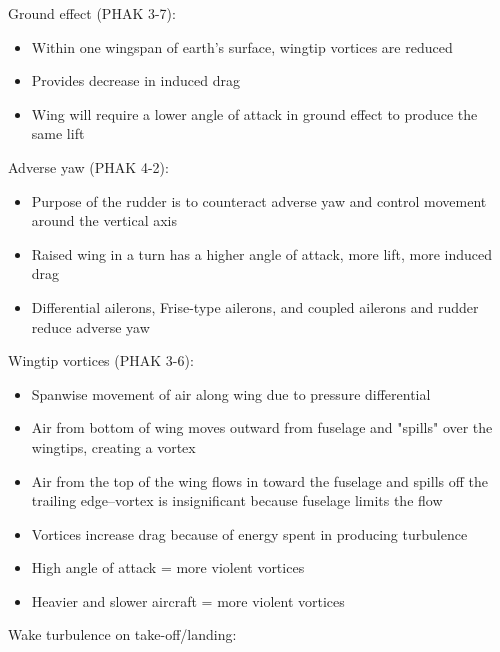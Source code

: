 \documentclass[twoside,openright]{report}
\begin{document}
Ground effect (PHAK 3-7):

\begin{itemize}
  \item Within one wingspan of earth’s surface, wingtip vortices are reduced

  \item Provides decrease in induced drag

  \item Wing will require a lower angle of attack in ground effect to produce
    the same lift
\end{itemize}

Adverse yaw (PHAK 4-2):

\begin{itemize}
  \item Purpose of the rudder is to counteract adverse yaw and control movement
    around the vertical axis

  \item Raised wing in a turn has a higher angle of attack, more lift, more
    induced drag

  \item Differential ailerons, Frise-type ailerons, and coupled ailerons and
    rudder reduce adverse yaw
\end{itemize}


Wingtip vortices (PHAK 3-6):

\begin{itemize}
    \item Spanwise movement of air along wing due to pressure differential

    \item Air from bottom of wing moves outward from fuselage and "spills" over
      the wingtips, creating a vortex

    \item Air from the top of the wing flows in toward the fuselage and spills
      off the trailing edge--vortex is insignificant because fuselage limits the
      flow

    \item Vortices increase drag because of energy spent in producing turbulence

    \item High angle of attack = more violent vortices

    \item Heavier and slower aircraft = more violent vortices
\end{itemize}

Wake turbulence on take-off/landing:
\end{document}
